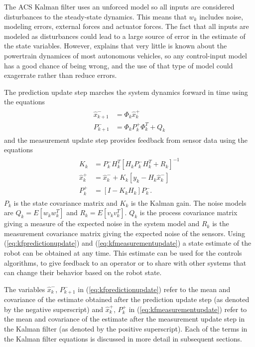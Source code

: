 The ACS Kalman filter uses an unforced model so all inputs are considered disturbances to the steady-state dynamics. This means that $w_k$ includes noise, modeling errors, external forces and actuator forces. The fact that all inputs are modeled as disturbances could lead to a large source of error in the estimate of the state variables. However, \cite{Kelly_1994_338} explains that very little is known about the powertrain dynamices of most autonomous vehicles, so any control-input model has a good chance of being wrong, and the use of that type of model could exagerrate rather than reduce errors.

The prediction update step marches the system dynamics forward in time using the equations
\begin{align}
\label{eq:kfpredictionupdate}
\begin{split}
\hat{x}_{k+1}^- &= \Phi_k\hat{x}_k^+ \\
P_{k+1}^- &= \Phi_kP_k^+\Phi_k^T + Q_k
\end{split}
\end{align}
and the measurement update step provides feedback from sensor data using the equations
\begin{align}
\label{eq:kfmeasurementupdate}
\begin{split}
K_k &= P_k^-H_k^T\left[H_kP_k^-H_k^T + R_k\right]^{-1} \\
\hat{x}_k^+ &= \hat{x}_k^- + K_k\left[y_k - H_k\hat{x}_k^-\right] \\
P_k^+ &= \left[I - K_kH_k\right]P_k^-.
\end{split}
\end{align}
$P_k$ is the state covariance matrix and $K_k$ is the Kalman gain. The noise models are $Q_k = E[w_kw_k^T]$ and $R_k = E[v_kv_k^T]$. $Q_k$ is the process covariance matrix giving a measure of the expected noise in the system model and $R_k$ is the measurement covariance matrix giving the expected noise of the sensors. Using (\ref{eq:kfpredictionupdate}) and (\ref{eq:kfmeasurementupdate}) a state estimate of the robot can be obtained at any time. This estimate can be used for the controls algorithms, to give feedback to an operator or to share with other systems that can change their behavior based on the robot state.

The variables $\hat{x}_k^-$, $P_{k+1}^-$ in (\ref{eq:kfpredictionupdate}) refer to the mean and covariance of the estimate obtained after the prediction update step (as denoted by the negative superscript) and $\hat{x}_k^+$, $P_{k}^+$ in (\ref{eq:kfmeasurementupdate}) refer to the mean and covariance of the estimate after the measurement update step in the Kalman filter (as denoted by the positive superscript). Each of the terms in the Kalman filter equations is discussed in more detail in subsequent sections.

